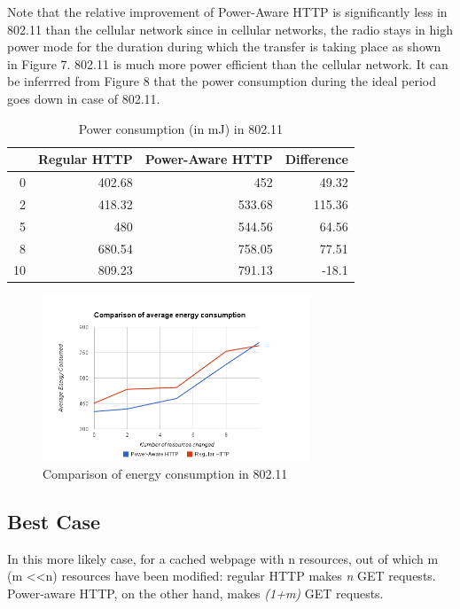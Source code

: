 \documentclass{sigplanconf}
\begin{document}
Note that the relative improvement of Power-Aware HTTP is significantly less in 802.11 than the cellular network since in cellular networks, the radio stays in high power mode for the duration during which the transfer is taking place as shown in Figure 7. 802.11 is much more power efficient than the cellular network. It can be inferrred from Figure 8 that the power consumption during the ideal period goes down in case of 802.11.

\begin{table}[htbp]
\centering
\caption{Power consumption (in mJ) in 802.11}
\begin{tabular}{|r|r|r|r|}
\hline
\multicolumn{1}{|l|}{} & \multicolumn{1}{l|}{Regular HTTP} & \multicolumn{1}{l|}{Power-Aware HTTP} & \multicolumn{1}{l|}{Difference} \\ \hline
0 & 402.68 & 452 & 49.32 \\ \hline
2 & 418.32 & 533.68 & 115.36 \\ \hline
5 & 480 & 544.56 & 64.56 \\ \hline
8 & 680.54 & 758.05 & 77.51 \\ \hline
10 & 809.23 & 791.13 & -18.1 \\ \hline
\end{tabular}
\label{}
\end{table}

\begin{figure}[ht!]
\centering
\includegraphics[width=80mm]{avg_energy_wifi.png}
\caption{Comparison of energy consumption in 802.11}
\label{fig:sp_gd_mnist}
\end{figure}


\subsection{Best Case}

In this more likely case, for a cached webpage with n resources, out of which m (m \textless \textless n) resources have been modified: regular HTTP makes {\it n} GET requests. Power-aware HTTP, on the other hand, makes {\it (1+m)} GET requests.
\end{document}
